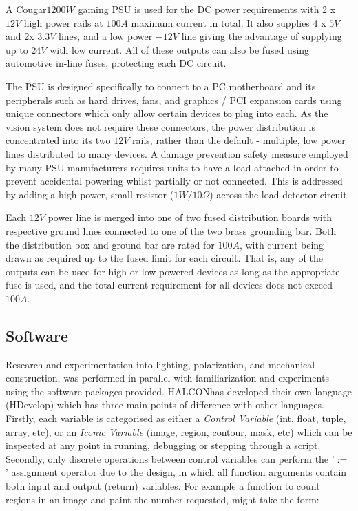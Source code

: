 \documentclass[fleqn,twoside,12pt]{report}
\begin{document}
A Cougar\texttrademark $1200W$ gaming PSU is used for the DC power requirements with 2 x $12V$ high power rails at $100A$ maximum current in total. It also supplies 4 x $5V$ and 2x $3.3V$ lines, and a low power $-12V$ line giving the advantage of supplying up to $24V$ with low current. All of these outputs can also be fused using automotive in-line fuses, protecting each DC circuit. 


The PSU is designed specifically to connect to a PC motherboard and its peripherals such as hard drives, fans, and graphics / PCI expansion cards using unique connectors which only allow certain devices to plug into each. As the vision system does not require these connectors, the power distribution is concentrated into its two $12V$ rails, rather than the default - multiple, low power lines distributed to many devices. A damage prevention safety measure employed by many PSU manufacturers requires units to have a load attached in order to prevent accidental powering whilst partially or not connected. This is addressed by adding a high power, small resistor ($1W/10\Omega$) across the load detector circuit.  


Each $12V$ power line is merged into one of two fused distribution boards with respective ground lines connected to one of the two brass grounding bar. Both the distribution box and ground bar are rated for $100A$, with current being drawn as required up to the fused limit for each circuit. That is, any of the outputs can be used for high or low powered devices as long as the appropriate fuse is used, and the total current requirement for all devices does not exceed $100A$. 


\subsection{Software}
\label{sec:software}

Research and experimentation into lighting, polarization, and mechanical construction, was performed in parallel with familiarization and experiments using the software packages provided. HALCON\texttrademark has developed their own language (HDevelop\texttrademark) which has three main points of difference with other languages. Firstly, each variable is categorised as either a \textit{Control Variable} (int, float, tuple, array, etc), or an \textit{Iconic Variable} (image, region, contour, mask, etc) which can be inspected at any point in running, debugging or stepping through a script. Secondly, only discrete operations between control variables can perform the '$:=$' assignment operator due to the design, in which all function arguments contain both input and output (return) variables. For example a function to count regions in an image and paint the number requested, might take the form:
\end{document}
